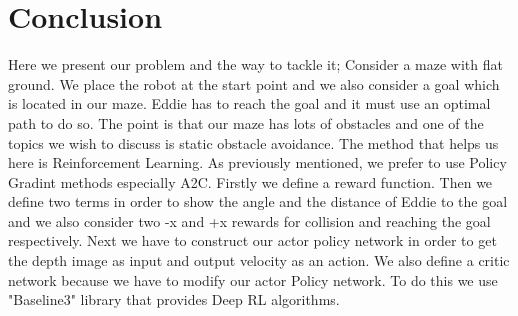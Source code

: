 \newpage
\section{Conclusion}
\label{chapter3}


Here we present our problem and the way to tackle it; Consider a maze with flat ground. We place the robot at the start point and we also consider a goal which is located in our maze.
Eddie has to reach the goal and it must use an optimal path to do so. The point is that our maze has lots of obstacles and one of the topics we wish to discuss is static obstacle avoidance.
The method that helps us here is Reinforcement Learning. As previously mentioned, we prefer to use Policy Gradint methods especially A2C. Firstly we define a reward function. Then we define two terms in order to show the angle and the distance of Eddie to the goal and we also consider two -x and +x rewards for collision and reaching the goal respectively. Next we have to construct our actor policy network in order to get the depth image as input and output velocity as an action. We also define a critic network because we have to modify our actor Policy network. To do this we use "Baseline3" library that provides Deep RL algorithms.
